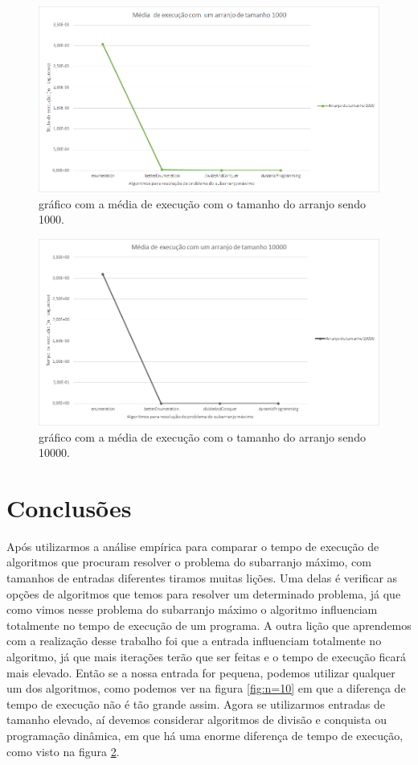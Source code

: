 \documentclass[
	12pt,				%
	oneside,   	        %
	a4paper,			%
	english,			%
	french,				%
	spanish,			%
	brazil,				%
	]{pacotes/abntex2}
\begin{document}
\begin{figure}[!htb]
    \center
    \includegraphics[width=16cm]{figuras/n=1000.png}
    \caption{gráfico com a média de execução com o tamanho do arranjo sendo 1000.}
    \label{fig:n=1000}    
\end{figure}

\begin{figure}[!htb]
    \center
    \includegraphics[width=16cm]{figuras/n=10000.png}
    \caption{gráfico com a média de execução com o tamanho do arranjo sendo 10000.}
    \label{fig:n=10000}    
\end{figure}

\clearpage
\section{Conclusões}
\label{sec:conclusoes}
Após utilizarmos a análise empírica para comparar o tempo de execução de algoritmos que procuram resolver o problema do subarranjo máximo, com tamanhos de entradas diferentes tiramos muitas lições. Uma delas é verificar as opções de algoritmos que temos para resolver um determinado problema, já que como vimos nesse problema do subarranjo máximo o algoritmo influenciam totalmente no tempo de execução de um programa. A outra lição que aprendemos com a realização desse trabalho foi que a entrada influenciam totalmente no algoritmo, já que mais iterações terão que ser feitas e o tempo de execução ficará mais elevado. Então se a nossa entrada for pequena, podemos utilizar qualquer um dos algoritmos, como podemos ver na figura \ref{fig:n=10} em que a diferença de tempo de execução não é tão grande assim. Agora se utilizarmos entradas de tamanho elevado, aí devemos considerar algoritmos de divisão e conquista ou programação dinâmica, em que há uma enorme diferença de tempo de execução, como visto na figura \ref{fig:n=10000}.
\end{document}
